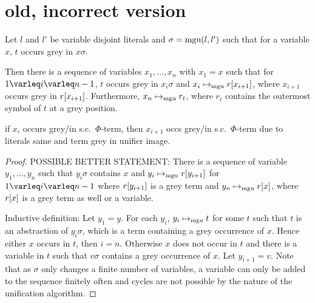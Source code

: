 \documentclass[,%
	paper=a4,%
	DIV11, %
	twoside=false,%
	liststotoc,
	bibtotoc,
	draft=false,%
	numbers=noendperiod
]{scrartcl}
\begin{document}

\clearpage

\section{old, incorrect version}


\begin{lemma}
	\label{lemma:unified_term_starts_somewhere_grey}
	Let $l$ and $l'$ be variable disjoint literals and $\sigma = \operatorname{mgu}(l, l')$
	such that for a variable $x$, $t$ occurs grey in $x\sigma$.

	Then there is a sequence of variables $x_1,\dots, x_n$ with $x_1 = x$ such that for $1\varleq i \varleq n-1$,
	$t$ occurs grey in $x_i \sigma$ and
	$x_i \mapsto_{\operatorname{mgu}} r[x_{i+1}]$, where $x_{i+1}$ occurs grey in $r[x_{i+1}]$.
	Furthermore,
	$x_n \mapsto_{\operatorname{mgu}} r_t$, where $r_t$ contains the outermost symbol of $t$ at a grey position.


	 if $x_i$ occurs grey/in s.c.\ $\Phi$-term, then $x_{i+1}$ occs grey/in s.c.\ $\Phi$-term due to literals same and term grey in unifier image.
\end{lemma}

\begin{proof}
	
	POSSIBLE BETTER STATEMENT:
	There is a sequence of variable $y_1, \dots, y_n$ such that $y_i\sigma$ contains $x$ and $y_i \mapsto_{\operatorname{mgu}} r[y_{i+1}]$ for $1\varleq i \varleq n-1$ where $r[y_{i+1}]$ is a grey term and $y_n \mapsto_{\operatorname{mgu}} r[x]$, where $r[x]$ is a grey term as well or a variable.

	Inductive definition:
	Let $y_1 = y$. For each $y_i$, $y_i \mapsto_{\operatorname{mgu}} t$ for some $t$ such that $t$ is an abstraction of $y_i\sigma$, which is a term containing a grey occurrence of $x$.
	Hence either $x$ occurs in $t$, then $i=n$.
	Otherwise $x$ does not occur in $t$ and there is a variable in $t$ such that $v\sigma$ contains a grey occurrence of $x$.
	Let $y_{i+1} = v$.
	Note that as $\sigma$ only changes a finite number of variables, a variable can only be added to the sequence finitely often and cycles are not possible by the nature of the unification algorithm.
\end{proof}
\end{document}
